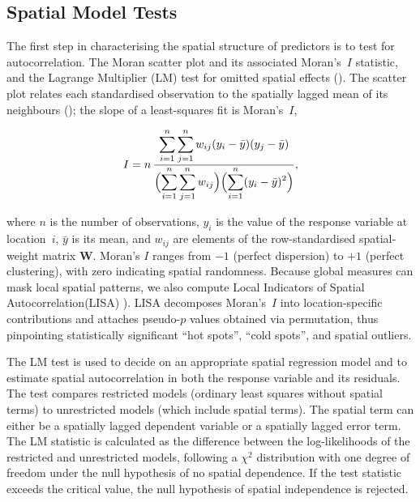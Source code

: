 \documentclass[lineno,pdflatex,sn-basic]{sn-jnl}%
\theoremstyle{thmstyleone}%
\theoremstyle{thmstyletwo}%
\theoremstyle{thmstylethree}%
\begin{document}
\subsection{Spatial Model Tests}\label{spatialTest}

The first step in characterising the spatial structure of predictors is to test for autocorrelation. The Moran scatter plot and its associated Moran’s~$I$ statistic, and the Lagrange Multiplier (LM) test for omitted spatial effects (\cite{anselin1996simple}). 
The scatter plot relates each standardised observation to the spatially lagged mean of its neighbours (\cite{anselin1988spatial}); the slope of a least-squares fit is Moran’s~$I$,

\begin{equation} \label{eq:moranI}
  I = n \, 
      \frac{\displaystyle\sum_{i=1}^n \sum_{j=1}^n w_{ij}(y_i-\bar{y})(y_j-\bar{y})}
           {\displaystyle\Bigl(\sum_{i=1}^n \sum_{j=1}^n w_{ij}\Bigr)
            \Bigl(\sum_{i=1}^n (y_i-\bar{y})^2\Bigr)},
\end{equation}

where $n$ is the number of observations, $y_i$ is the value of the response variable at location~$i$,  
$\bar{y}$ is its mean, and $w_{ij}$ are elements of the row-standardised spatial‐weight matrix $\mathbf{W}$. 
Moran’s $I$ ranges from $-1$ (perfect dispersion) to $+1$ (perfect clustering), with zero indicating spatial randomness.
Because global measures can mask local spatial patterns, we also compute Local Indicators of Spatial Autocorrelation(LISA) \cite{anselin1996simple}).  
LISA decomposes Moran’s~$I$ into location-specific contributions and attaches pseudo-$p$ values obtained via permutation, thus pinpointing statistically significant “hot spots”, “cold spots”, and spatial outliers.  

The LM test is used to decide on an appropriate spatial regression model and to estimate spatial autocorrelation in both the response variable and its residuals. 
The test compares restricted models (ordinary least squares without spatial terms) to unrestricted models (which include spatial terms). 
The spatial term can either be a spatially lagged dependent variable or a spatially lagged error term. 
The LM statistic is calculated as the difference between the log-likelihoods of the restricted and unrestricted models, following a $\chi^2$ distribution with one degree of freedom under the null hypothesis of no spatial dependence. 
If the test statistic exceeds the critical value, the null hypothesis of spatial independence is rejected.
\end{document}
